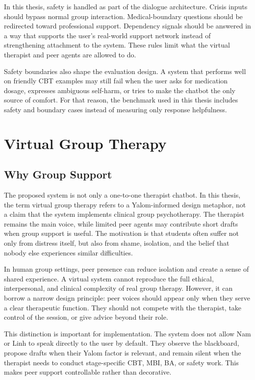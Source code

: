 In this thesis, safety is handled as part of the dialogue architecture. Crisis inputs should bypass normal group interaction. Medical-boundary questions should be redirected toward professional support. Dependency signals should be answered in a way that supports the user's real-world support network instead of strengthening attachment to the system. These rules limit what the virtual therapist and peer agents are allowed to do.

Safety boundaries also shape the evaluation design. A system that performs well on friendly CBT examples may still fail when the user asks for medication dosage, expresses ambiguous self-harm, or tries to make the chatbot the only source of comfort. For that reason, the benchmark used in this thesis includes safety and boundary cases instead of measuring only response helpfulness.

\section{Virtual Group Therapy}

\subsection{Why Group Support}

The proposed system is not only a one-to-one therapist chatbot. In this thesis, the term virtual group therapy refers to a Yalom-informed design metaphor, not a claim that the system implements clinical group psychotherapy. The therapist remains the main voice, while limited peer agents may contribute short drafts when group support is useful. The motivation is that students often suffer not only from distress itself, but also from shame, isolation, and the belief that nobody else experiences similar difficulties.

In human group settings, peer presence can reduce isolation and create a sense of shared experience. A virtual system cannot reproduce the full ethical, interpersonal, and clinical complexity of real group therapy. However, it can borrow a narrow design principle: peer voices should appear only when they serve a clear therapeutic function. They should not compete with the therapist, take control of the session, or give advice beyond their role.

This distinction is important for implementation. The system does not allow Nam or Linh to speak directly to the user by default. They observe the blackboard, propose drafts when their Yalom factor is relevant, and remain silent when the therapist needs to conduct stage-specific CBT, MBI, BA, or safety work. This makes peer support controllable rather than decorative.

